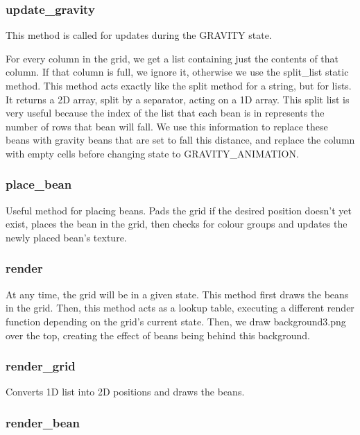 \documentclass{report}
\begin{document}
\subsubsection{update\_gravity}

This method is called for updates during the GRAVITY state.

For every column in the grid, we get a list containing just the contents of that column. If that column is full, we ignore it, otherwise we use the split\_list static method. This method acts exactly like the split method for a string, but for lists. It returns a 2D array, split by a separator, acting on a 1D array. This split list is very useful because the index of the list that each bean is in represents the number of rows that bean will fall. We use this information to replace these beans with gravity beans that are set to fall this distance, and replace the column with empty cells before changing state to GRAVITY\_ANIMATION.

\subsubsection{place\_bean}

Useful method for placing beans. Pads the grid if the desired position doesn't yet exist, places the bean in the grid, then checks for colour groups and updates the newly placed bean's texture.

\subsubsection{render}

At any time, the grid will be in a given state. This method first draws the beans in the grid. Then, this method acts as a lookup table, executing a different render function depending on the grid's current state. Then, we draw background3.png over the top, creating the effect of beans being behind this background.

\subsubsection{render\_grid}

Converts 1D list into 2D positions and draws the beans.

\subsubsection{render\_bean}
\end{document}
